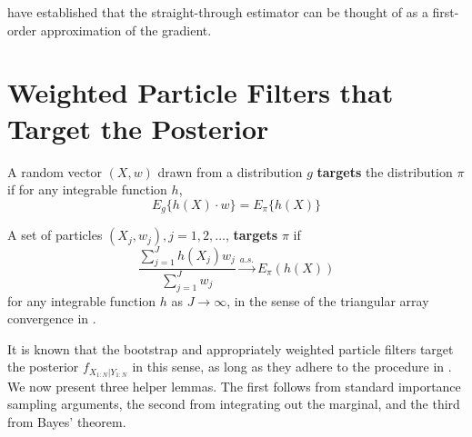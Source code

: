 \documentclass{article}
\begin{document}



\citet{liu2023bridging} have established that the straight-through estimator can be thought of as a first-order approximation of the gradient.








\appendix
\renewcommand{\thefigure}{A\arabic{figure}}
\setcounter{figure}{0}

\section{Weighted Particle Filters that Target the Posterior}


\begin{defn}
    A random vector $(X, w)$ drawn from a distribution $g$ \textbf{targets} the distribution $\pi$ if for any integrable function $h$,
    $$
    E_g\{h(X) \cdot w\}=E_\pi\{h(X)\}
    $$
    
    A set of particles $(X_j, w_j), j=1,2, \ldots$, \textbf{targets} $\pi$ if
    $$
    \frac{\sum_{j=1}^J h(X_j) w_j}{\sum_{j=1}^J w_j} \stackrel{a.s.}{\to} E_\pi(h(X))
    $$
    for any integrable function $h$ as $J \to \infty$, in the sense of the triangular array convergence in \cite{chopin2004clt}. 
\end{defn}

It is known that the bootstrap and appropriately weighted particle filters target the posterior $f_{X_{1:N}|Y_{1:N}}$ in this sense, as long as they adhere to the procedure in \cite{chopin2004clt}. We now present three helper lemmas. The first follows from standard importance sampling arguments, the second from integrating out the marginal, and the third from Bayes' theorem. 
\end{document}
